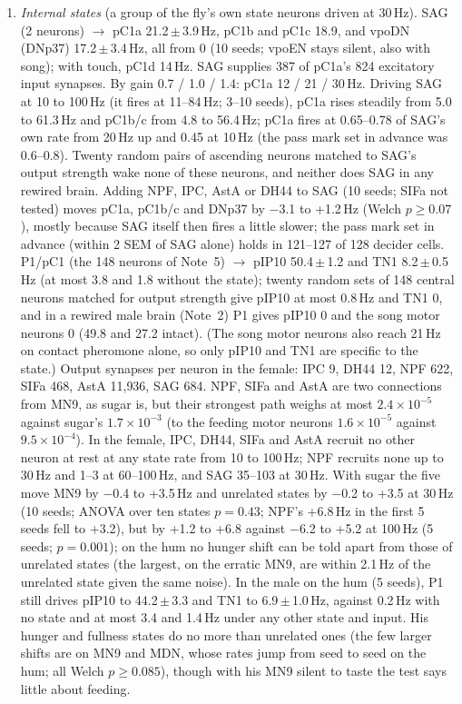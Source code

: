\begin{enumerate}[leftmargin=*, label=\arabic*., itemsep=4pt]
\item \emph{Internal states} (a group of the fly's own state neurons driven at 30\,Hz). SAG (2 neurons) $\rightarrow$ pC1a 21.2\,$\pm$\,3.9\,Hz, pC1b and pC1c 18.9, and vpoDN (DNp37) 17.2\,$\pm$\,3.4\,Hz, all from 0 (10 seeds; vpoEN stays silent, also with song); with touch, pC1d 14\,Hz. SAG supplies 387 of pC1a's 824 excitatory input synapses. By gain 0.7 / 1.0 / 1.4: pC1a 12 / 21 / 30\,Hz. Driving SAG at 10 to 100\,Hz (it fires at 11--84\,Hz; 3--10 seeds), pC1a rises steadily from 5.0 to 61.3\,Hz and pC1b/c from 4.8 to 56.4\,Hz; pC1a fires at 0.65--0.78 of SAG's own rate from 20\,Hz up and 0.45 at 10\,Hz (the pass mark set in advance was 0.6--0.8). Twenty random pairs of ascending neurons matched to SAG's output strength wake none of these neurons, and neither does SAG in any rewired brain. Adding NPF, IPC, AstA or DH44 to SAG (10 seeds; SIFa not tested) moves pC1a, pC1b/c and DNp37 by $-$3.1 to +1.2\,Hz (Welch $p\geq0.07$), mostly because SAG itself then fires a little slower; the pass mark set in advance (within 2 SEM of SAG alone) holds in 121--127 of 128 decider cells. P1/pC1 (the 148 neurons of Note~5) $\rightarrow$ pIP10 50.4\,$\pm$\,1.2 and TN1 8.2\,$\pm$\,0.5\,Hz (at most 3.8 and 1.8 without the state); twenty random sets of 148 central neurons matched for output strength give pIP10 at most 0.8\,Hz and TN1 0, and in a rewired male brain (Note~2) P1 gives pIP10 0 and the song motor neurons 0 (49.8 and 27.2 intact). (The song motor neurons also reach 21\,Hz on contact pheromone alone, so only pIP10 and TN1 are specific to the state.) Output synapses per neuron in the female: IPC 9, DH44 12, NPF 622, SIFa 468, AstA 11{,}936, SAG 684. NPF, SIFa and AstA are two connections from MN9, as sugar is, but their strongest path weighs at most $2.4\times10^{-5}$ against sugar's $1.7\times10^{-3}$ (to the feeding motor neurons $1.6\times10^{-5}$ against $9.5\times10^{-4}$). In the female, IPC, DH44, SIFa and AstA recruit no other neuron at rest at any state rate from 10 to 100\,Hz; NPF recruits none up to 30\,Hz and 1--3 at 60--100\,Hz, and SAG 35--103 at 30\,Hz. With sugar the five move MN9 by $-$0.4 to +3.5\,Hz and unrelated states by $-$0.2 to +3.5 at 30\,Hz (10 seeds; ANOVA over ten states $p=0.43$; NPF's +6.8\,Hz in the first 5 seeds fell to +3.2), but by +1.2 to +6.8 against $-$6.2 to +5.2 at 100\,Hz (5 seeds; $p=0.001$); on the hum no hunger shift can be told apart from those of unrelated states (the largest, on the erratic MN9, are within 2.1\,Hz of the unrelated state given the same noise). In the male on the hum (5 seeds), P1 still drives pIP10 to 44.2\,$\pm$\,3.3 and TN1 to 6.9\,$\pm$\,1.0\,Hz, against 0.2\,Hz with no state and at most 3.4 and 1.4\,Hz under any other state and input. His hunger and fullness states do no more than unrelated ones (the few larger shifts are on MN9 and MDN, whose rates jump from seed to seed on the hum; all Welch $p\geq0.085$), though with his MN9 silent to taste the test says little about feeding.

\end{enumerate}
